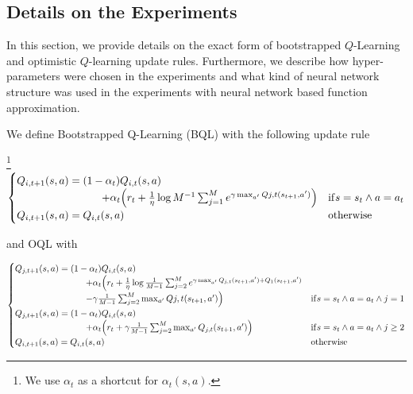 \subsection{Details on the Experiments}
In this section, we provide details on the exact form of bootstrapped $Q$-Learning and optimistic
$Q$-learning update rules. Furthermore, we describe how hyper-parameters were chosen in the experiments and what kind of neural network structure was used in the experiments with neural network based function
approximation.

We define Bootstrapped Q-Learning (BQL) with the following update rule
\begin{definition}
	\footnote{We use $\alpha_t$ as a shortcut for $\alpha_t(s,a)$.}
	\begin{eqnarray}
	\begin{cases}
	Q_{i, t+1}(s,a) = (1-\alpha_t)Q_{i,t}(s,a)  \\
	\quad \quad \quad \quad \quad \quad \quad \quad  + \alpha_t \Bigl(r_t + \frac{1}{\eta} \log M^{-1} \sum_{j=1}^M e^{\gamma \max_{a'} Q{j,t}(s_{t+1}, a')}\Bigr) &  \mathrm{if} s = s_t \land a = a_t \nonumber \\
	Q_{i, t+1}(s,a) = Q_{i,t}(s,a) & \mathrm{otherwise}
	\end{cases} \nonumber 
	\end{eqnarray}
	\label{def:bootqlearning}
\end{definition}
and OQL with
\begin{definition}
	\begin{eqnarray}
	\begin{cases}
	Q_{j, t+1}(s,a) = (1-\alpha_t)Q_{i,t}(s,a)  \\
	\quad \quad \quad \quad \quad \quad \quad \quad  + \alpha_t \Bigl(r_t + \frac{1}{\eta} \log \frac{1}{M-1} \sum_{j=2}^M e^{\gamma \max_{a'} Q_{j,t}(s_{t+1}, a') + Q_1(s_{t+1}, a')} \nonumber \\
	\quad \quad \quad \quad \quad \quad \quad \quad  -\gamma \frac{1}{M-1} \sum_{j=2}^M  \max_{a'} Q{j,t}(s_{t+1}, a')\Bigr)  &  \mathrm{if} s = s_t \land a = a_t \land  j =1 \nonumber \\
	Q_{j, t+1}(s,a) = (1-\alpha_t)Q_{i,t}(s,a)  \\
	\quad \quad \quad \quad \quad \quad \quad \quad  + \alpha_t \Bigl(r_t + \gamma \frac{1}{M-1} \sum_{j=2}^M  \max_{a'} Q_{j,t}(s_{t+1}, a')\Bigr) &  \mathrm{if} s = s_t \land a = a_t \land  j \geq 2 \nonumber \\
	Q_{i, t+1}(s,a) = Q_{i,t}(s,a) & \mathrm{otherwise}
	\end{cases} \nonumber 
	\end{eqnarray}
	\label{def:optqlearningmod}
\end{definition}
